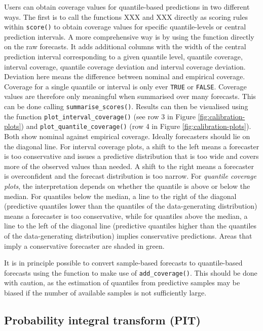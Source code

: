 \documentclass[
]{jss}
\begin{document}
Users can obtain coverage values for quantile-based predictions in two
different ways. The first is to call the functions XXX and XXX directly
as scoring rules within \texttt{score()} to obtain coverage values for
specific quantile-levels or central prediction intervals. A more
comprehensive way is by using the function 
directly on the raw forecasts. It adds additional columns with the width
of the central prediction interval corresponding to a given quantile
level, quantile coverage, interval coverage, quantile coverage deviation
and interval coverage deviation. Deviation here means the difference
between nominal and empirical coverage. Coverage for a single quantile
or interval is only ever \texttt{TRUE} or \texttt{FALSE}. Coverage
values are therefore only meaningful when summarised over many
forecasts. This can be done calling \texttt{summarise\_scores()}.
Results can then be visualised using the function
\texttt{plot\_interval\_coverage()} (see row 3 in Figure
\ref{fig:calibration-plots}) and \texttt{plot\_quantile\_coverage()}
(row 4 in Figure \ref{fig:calibration-plots}). Both show nominal against
empirical coverage. Ideally forecasters should lie on the diagonal line.
For interval coverage plots, a shift to the left means a forecaster is
too conservative and issues a predictive distribution that is too wide
and covers more of the observed values than needed. A shift to the right
means a forecaster is overconfident and the forecast distribution is too
narrow. For \emph{quantile coverage plots}, the interpretation depends
on whether the quantile is above or below the median. For quantiles
below the median, a line to the right of the diagonal (predictive
quantiles lower than the quantiles of the data-generating distribution)
means a forecaster is too conservative, while for quantiles above the
median, a line to the left of the diagonal line (predictive quantiles
higher than the quantiles of the data-generating distribution) implies
conservative predictions. Areas that imply a conservative forecaster are
shaded in green.

It is in principle possible to convert sample-based forecasts to
quantile-based forecasts using the function
 to make use of
\texttt{add\_coverage()}. This should be done with caution, as the
estimation of quantiles from predictive samples may be biased if the
number of available samples is not sufficiently large.

\subsection{Probability integral transform
(PIT)}\label{probability-integral-transform-pit}
\end{document}
